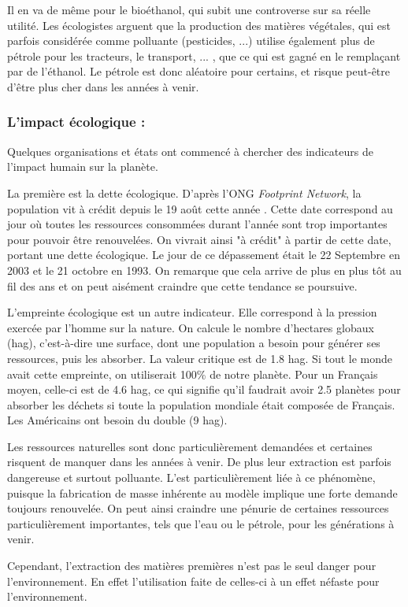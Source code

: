 Il en va de même pour le bioéthanol, qui subit une controverse sur sa réelle utilité. Les écologistes arguent que la production des matières végétales, qui est parfois considérée comme polluante (pesticides, ...) utilise également plus de pétrole pour les tracteurs, le transport, ... , que ce qui est gagné en le remplaçant par de l’éthanol. Le pétrole est donc aléatoire pour certains, et risque peut-être d'être plus cher dans les années à venir.


\subsubsection{L'impact écologique : } 

Quelques organisations et états ont commencé à chercher des indicateurs de l'impact humain sur la planète.

La première est la dette écologique. D'après l'ONG \textit{Footprint Network}, la population vit à crédit depuis le 19 août cette année \cite{DateACredit}. Cette date correspond au jour où toutes les ressources consommées durant l'année sont trop importantes pour pouvoir être renouvelées. On vivrait ainsi "à crédit" à partir de cette date, portant une dette écologique. Le jour de ce dépassement était le 22 Septembre en 2003 et le 21 octobre en 1993. On remarque que cela arrive de plus en plus tôt au fil des ans et on peut aisément craindre que cette tendance se poursuive.

L'empreinte écologique est un autre indicateur. Elle correspond à la pression exercée par l'homme sur la nature. On calcule le nombre d'hectares globaux (hag), c'est-à-dire une surface, dont une population a besoin pour générer ses ressources, puis les absorber. La valeur critique est de 1.8 hag. Si tout le monde avait cette empreinte, on utiliserait 100\% de notre planète. Pour un Français moyen, celle-ci est de 4.6 hag, ce qui signifie qu'il faudrait avoir 2.5 planètes pour absorber les déchets si toute la population mondiale était composée de Français. Les Américains ont besoin du double (9 hag).

\bigbreak
Les ressources naturelles sont donc particulièrement demandées et certaines risquent de manquer dans les années à venir. De plus leur extraction est parfois dangereuse et surtout polluante. L'\op est particulièrement liée à ce phénomène, puisque la fabrication de masse inhérente au modèle implique une forte demande toujours renouvelée. On peut ainsi craindre une pénurie de certaines ressources particulièrement importantes, tels que l'eau ou le pétrole, pour les générations à venir.

\medbreak
Cependant, l'extraction des matières premières n'est pas le seul danger pour l'environnement. En effet l'utilisation faite de celles-ci à un effet néfaste pour l'environnement.






